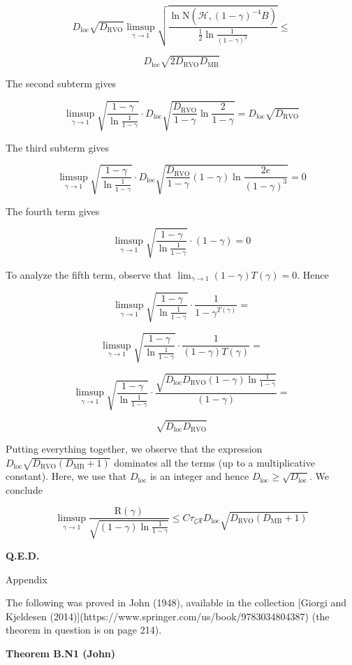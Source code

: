 \documentclass[a4paper]{article}
\newcommand{\Co}[1]{}
\newcommand{\AP}[1]{\left(#1\right)}
\newcommand{\B}{B}
\newcommand{\R}{\mathcal{R}}
\newcommand{\Hy}{\mathcal{H}}
\newcommand{\DRVO}{D_{\mathrm{RVO}}}
\newcommand{\DMB}{D_{\mathrm{MB}}}
\newcommand{\DL}{D_{\mathrm{loc}}}
\newcommand{\N}{\mathrm{N}}
\newcommand{\Reg}{\mathrm{R}}
\begin{document}
$$\DL\sqrt{\DRVO}\limsup_{\gamma\rightarrow1}{\sqrt{\frac{\ln{\N\AP{\Hy,(1-\gamma)^{-4}\B}}}{\frac{1}{2}\ln{\frac{1}{(1-\gamma)^2}}}}}\leq$$

$$\DL\sqrt{2\DRVO\DMB}$$

The second subterm gives

$$\limsup_{\gamma\rightarrow1}{\sqrt{\frac{1-\gamma}{\ln{\frac{1}{1-\gamma}}}}\cdot\DL\sqrt{\frac{\DRVO}{1-\gamma}\ln{\frac{2}{1-\gamma}}}}=\DL\sqrt{\DRVO}$$

The third subterm gives

$$\limsup_{\gamma\rightarrow1}{\sqrt{\frac{1-\gamma}{\ln{\frac{1}{1-\gamma}}}}\cdot\DL\sqrt{\frac{\DRVO}{1-\gamma}(1-\gamma) \ln{\frac{2e}{(1-\gamma)^3}}}}=0$$

The fourth term gives

$$\limsup_{\gamma\rightarrow1}{\sqrt{\frac{1-\gamma}{\ln{\frac{1}{1-\gamma}}}}\cdot(1-\gamma)}=0$$

To analyze the fifth term, observe that $\lim_{\gamma\rightarrow1}{(1-\gamma)T(\gamma)}=0$. Hence

$$\limsup_{\gamma\rightarrow1}{\sqrt{\frac{1-\gamma}{\ln{\frac{1}{1-\gamma}}}}\cdot\frac{1}{1-\gamma^{T(\gamma)}}}=$$

$$\limsup_{\gamma\rightarrow1}{\sqrt{\frac{1-\gamma}{\ln{\frac{1}{1-\gamma}}}}\cdot\frac{1}{(1-\gamma)T(\gamma)}}=$$

$$\limsup_{\gamma\rightarrow1}{\sqrt{\frac{1-\gamma}{\ln{\frac{1}{1-\gamma}}}}\cdot\frac{\sqrt{\DL\DRVO(1-\gamma)\ln\frac{1}{1-\gamma}}}{(1-\gamma)}}=$$

$$\sqrt{\DL\DRVO}$$

Putting everything together, we observe that the expression $\DL\sqrt{\DRVO(\DMB+1)}$ dominates all the terms (up to a multiplicative constant). Here, we use that $\DL$ is an integer and hence $\DL\geq\sqrt{\DL}$. We conclude

$$\limsup_{\gamma\rightarrow1}{\frac{\Reg(\gamma)}{\sqrt{(1-\gamma)\ln{\frac{1}{1-\gamma}}}}}\leq C\tau_{\zeta\R}\DL\sqrt{\DRVO(\DMB+1)}$$

\textbf{Q.E.D.}\Co{b}

\begin{Huge}Appendix\end{Huge}

The following was proved in John (1948), available in the collection [Giorgi and Kjeldesen (2014)](https://www.springer.com/us/book/9783034804387) (the theorem in question is on page 214). 

\textbf{Theorem B.N1 (John)}\Co{b}
\end{document}
